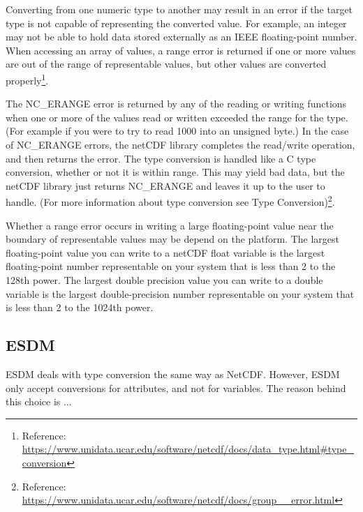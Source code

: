 Converting from one numeric type to another may result in an error if the target type is not capable of representing the converted value. For example, an integer may not be able to hold data stored externally as an IEEE floating-point number. When accessing an array of values, a range error is returned if one or more values are out of the range of representable values, but other values are converted properly\footnote{Reference: \url{https://www.unidata.ucar.edu/software/netcdf/docs/data_type.html\#type_conversion}}.

The NC\_ERANGE error is returned by any of the reading or writing functions when one or more of the values read or written exceeded the range for the type. (For example if you were to try to read 1000 into an unsigned byte.) In the case of NC\_ERANGE errors, the netCDF library completes the read/write operation, and then returns the error. The type conversion is handled like a C type conversion, whether or not it is within range. This may yield bad data, but the netCDF library just returns NC\_ERANGE and leaves it up to the user to handle. (For more information about type conversion see Type Conversion)\footnote{Reference: \url{https://www.unidata.ucar.edu/software/netcdf/docs/group__error.html}}.

\begin{framed}

\tocheck

Whether a range error occurs in writing a large floating-point value near the boundary of representable values may be depend on the platform. The largest floating-point value you can write to a netCDF float variable is the largest floating-point number representable on your system that is less than 2 to the 128th power. The largest double precision value you can write to a double variable is the largest double-precision number representable on your system that is less than 2 to the 1024th power.

\end{framed}

\subsection{ESDM}

\tab
ESDM deals with type conversion the same way as NetCDF. However, ESDM only accept conversions for attributes, and not for variables. The reason behind this choice is ...

\tocheck

